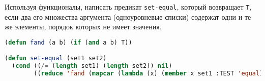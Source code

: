 Используя функционалы, написать предикат \verb|set-equal|, который возвращает
\verb|T|, если два его множества-аргумента (одноуровневые списки) содержат одни
и те же элементы, порядок которых не имеет значения.

\begin{lstlisting}[language=Lisp]
(defun fand (a b) (if (and a b) T))

(defun set-equal (set1 set2)
  (cond ((/= (length set1) (length set2)) nil)
        ((reduce 'fand (mapcar (lambda (x) (member x set1 :TEST 'equal)) set2)))))
\end{lstlisting}

